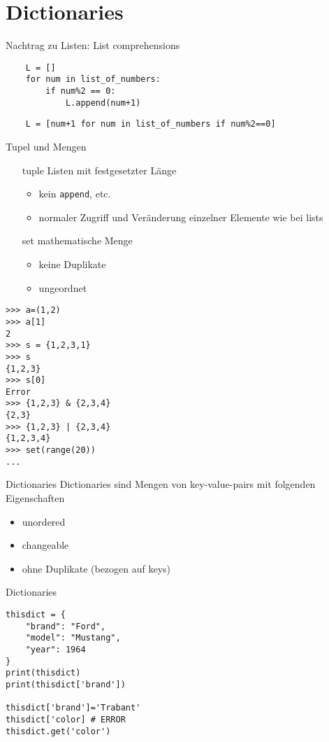 \section{Dictionaries}
\begin{frame}[fragile]{Nachtrag zu Listen: List comprehensions}
\begin{lstlisting}
    L = []
    for num in list_of_numbers:
        if num%2 == 0:
            L.append(num+1)
\end{lstlisting}
\begin{lstlisting}
    L = [num+1 for num in list_of_numbers if num%2==0]
\end{lstlisting}
\end{frame}

\begin{frame}[fragile]{Tupel und Mengen}
	\begin{itemize}
		\item[tuple] Listen mit festgesetzter Länge
		\begin{itemize}
			\item kein \texttt{append}, etc.
			\item normaler Zugriff und Veränderung einzelner Elemente wie bei lists
		\end{itemize}
		\item[set] mathematische Menge
		\begin{itemize}
			\item keine Duplikate
			\item ungeordnet
		\end{itemize}
	\end{itemize}
\begin{lstlisting}
>>> a=(1,2)
>>> a[1]
2
>>> s = {1,2,3,1}
>>> s
{1,2,3}
>>> s[0]
Error
>>> {1,2,3} & {2,3,4}
{2,3}
>>> {1,2,3} | {2,3,4}
{1,2,3,4}
>>> set(range(20))
...
\end{lstlisting}
\end{frame}

\begin{frame}[fragile]{Dictionaries}
	Dictionaries sind Mengen von key-value-pairs mit folgenden Eigenschaften
	\begin{itemize}
		\item unordered
		\item changeable
		\item ohne Duplikate (bezogen auf keys)
	\end{itemize}
\end{frame}

\begin{frame}[fragile]{Dictionaries}
\begin{lstlisting}
thisdict = {
    "brand": "Ford",
    "model": "Mustang",
    "year": 1964
}
print(thisdict)
print(thisdict['brand'])

thisdict['brand']='Trabant'
thisdict['color] # ERROR
thisdict.get('color')
\end{lstlisting}
\end{frame}

